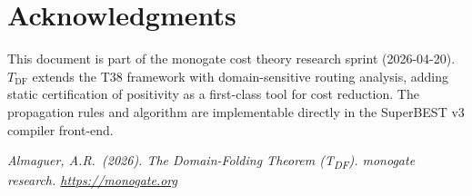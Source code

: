 \documentclass[12pt,a4paper]{article}
\theoremstyle{definition}
\begin{document}
\section*{Acknowledgments}

This document is part of the monogate cost theory research sprint (2026-04-20).
$T_{\mathrm{DF}}$ extends the T38 framework with domain-sensitive routing
analysis, adding static certification of positivity as a first-class tool for
cost reduction.  The propagation rules and algorithm are implementable directly
in the SuperBEST v3 compiler front-end.

\bigskip
\noindent\textit{Almaguer, A.R.\ (2026).
The Domain-Folding Theorem (T\textsubscript{DF}).
monogate research. \url{https://monogate.org}}
\end{document}

